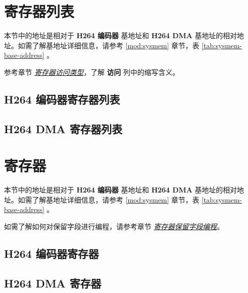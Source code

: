 \documentclass[main\_\_CN.tex]{subfiles}
\begin{document}









\clearpage
\section{寄存器列表}

本节中的地址是相对于 \textbf{H264 编码器} 基地址和 \textbf{H264 DMA} 基地址的相对地址。如需了解基地址详细信息，请参考 \ref{mod:sysmem} \textit{} 章节，表 \ref{tab:sysmem-base-address} \textit{}。

参考章节 \hyperref[glossary-access-types]{\textit{寄存器访问类型}}，了解 \textbf{访问} 列中的缩写含义。


\hypertarget{h264enc-reg-summ}{}
\subsection{H264 编码器寄存器列表}
\label{sec:h264enc-reg-summ}





\hypertarget{h264enc-dma-reg-summ}{}
\subsection{H264 DMA 寄存器列表}
\label{sec:h264enc-dma-reg-summ}






\clearpage
\section{寄存器}

本节中的地址是相对于 \textbf{H264 编码器} 基地址和 \textbf{H264 DMA} 基地址的相对地址。如需了解基地址详细信息，请参考 \ref{mod:sysmem} \textit{} 章节，表 \ref{tab:sysmem-base-address} \textit{}。

如需了解如何对保留字段进行编程，请参考章节 \hyperref[programming-reserved-field]{\textit{寄存器保留字段编程}}。


\subsection{H264 编码器寄存器}




\clearpage
\subsection{H264 DMA 寄存器}


\end{document}
